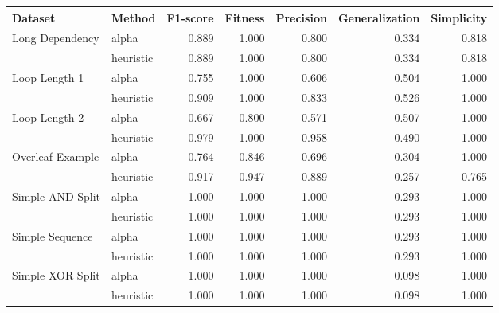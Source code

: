 \begin{tabular}{|l|l|r|r|r|r|r|}
\hline
 Dataset & Method & F1-score & Fitness & Precision & Generalization & Simplicity \\
\hline
Long Dependency & alpha & 0.889 & 1.000 & 0.800 & 0.334 & 0.818 \\
 & heuristic & 0.889 & 1.000 & 0.800 & 0.334 & 0.818 \\
\hline
Loop Length 1 & alpha & 0.755 & 1.000 & 0.606 & 0.504 & 1.000 \\
 & heuristic & 0.909 & 1.000 & 0.833 & 0.526 & 1.000 \\
\hline
Loop Length 2 & alpha & 0.667 & 0.800 & 0.571 & 0.507 & 1.000 \\
 & heuristic & 0.979 & 1.000 & 0.958 & 0.490 & 1.000 \\
\hline
Overleaf Example & alpha & 0.764 & 0.846 & 0.696 & 0.304 & 1.000 \\
 & heuristic & 0.917 & 0.947 & 0.889 & 0.257 & 0.765 \\
\hline
Simple AND Split & alpha & 1.000 & 1.000 & 1.000 & 0.293 & 1.000 \\
 & heuristic & 1.000 & 1.000 & 1.000 & 0.293 & 1.000 \\
\hline
Simple Sequence & alpha & 1.000 & 1.000 & 1.000 & 0.293 & 1.000 \\
 & heuristic & 1.000 & 1.000 & 1.000 & 0.293 & 1.000 \\
\hline
Simple XOR Split & alpha & 1.000 & 1.000 & 1.000 & 0.098 & 1.000 \\
 & heuristic & 1.000 & 1.000 & 1.000 & 0.098 & 1.000 \\
\hline
\end{tabular}